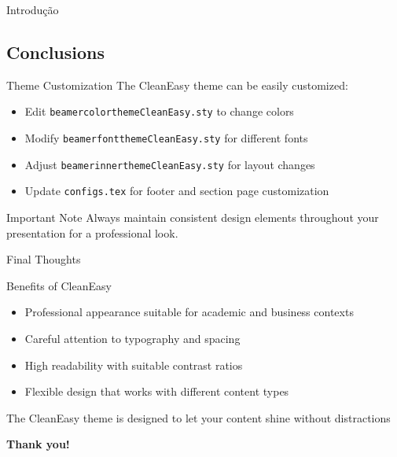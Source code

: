 \begin{frame}{Introdução}
\begin{frame}
\section{Conclusions}
\begin{frame}{Theme Customization}
  The CleanEasy theme can be easily customized:
  
  \begin{itemize}
    \item Edit \texttt{beamercolorthemeCleanEasy.sty} to change colors
    \item Modify \texttt{beamerfontthemeCleanEasy.sty} for different fonts
    \item Adjust \texttt{beamerinnerthemeCleanEasy.sty} for layout changes
    \item Update \texttt{configs.tex} for footer and section page customization
  \end{itemize}
  
  \begin{alertblock}{Important Note}
    Always maintain consistent design elements throughout your presentation for a professional look.
  \end{alertblock}
\end{frame}

\begin{frame}{Final Thoughts}
  \begin{block}{Benefits of CleanEasy}
    \begin{itemize}
      \item Professional appearance suitable for academic and business contexts
      \item Careful attention to typography and spacing
      \item High readability with suitable contrast ratios
      \item Flexible design that works with different content types
    \end{itemize}
  \end{block}
  
  \vspace{0.5cm}
  
  \begin{center}
    \large{The CleanEasy theme is designed to let your content shine without distractions}
  \end{center}
\end{frame}

\begin{frame}[plain]
  \centering
  \Huge \textbf{Thank you!}
  

\end{frame}
\end{frame}
\end{frame}
